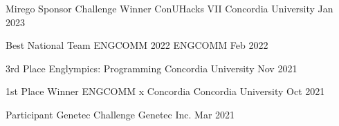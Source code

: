 

\begin{cvcomps}

  \cvcomp
    {Mirego Sponsor Challenge Winner} %
    {ConUHacks VII} %
    {Concordia University} %
    {Jan 2023} %

  \cvcomp
    {Best National Team} %
    {ENGCOMM 2022} %
    {ENGCOMM} %
    {Feb 2022} %

  \cvcomp
    {3rd Place} %
    {Englympics: Programming} %
    {Concordia University} %
    {Nov 2021} %

  \cvcomp
    {1st Place Winner} %
    {ENGCOMM x Concordia} %
    {Concordia University} %
    {Oct 2021} %

  \cvcomp
    {Participant} %
    {Genetec Challenge} %
    {Genetec Inc.} %
    {Mar 2021} %

\end{cvcomps}

